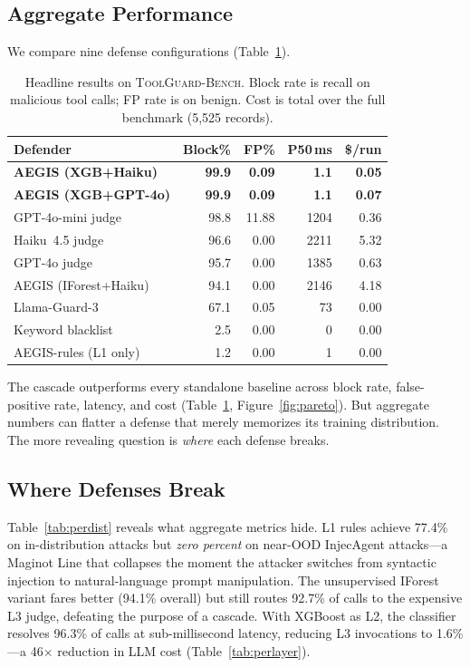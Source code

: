 \documentclass[sigplan,review,anonymous]{acmart}
\newcommand{\bench}{\textsc{ToolGuard-Bench}\xspace}
\begin{document}
\subsection{Aggregate Performance}

We compare nine defense configurations (Table~\ref{tab:overall}).

\begin{table}[t]
\centering\small
\caption{Headline results on \bench. Block rate is recall on malicious tool calls; FP rate is on benign. Cost is total over the full benchmark (5{,}525 records).}
\vspace{-0.1in}
\label{tab:overall}
\begin{tabular}{lrrrr}
\toprule
Defender & Block\% & FP\% & P50\,ms & \$/run \\
\midrule
\rowcolor{green!8}
\textbf{AEGIS (XGB+Haiku)} & \textbf{99.9} & \textbf{0.09} & \textbf{1.1} & \textbf{0.05} \\
\rowcolor{green!8}
\textbf{AEGIS (XGB+GPT-4o)} & \textbf{99.9} & \textbf{0.09} & \textbf{1.1} & \textbf{0.07} \\
GPT-4o-mini judge & 98.8 & 11.88 & 1204 & 0.36 \\
Haiku~4.5 judge & 96.6 & 0.00 & 2211 & 5.32 \\
GPT-4o judge & 95.7 & 0.00 & 1385 & 0.63 \\
AEGIS (IForest+Haiku) & 94.1 & 0.00 & 2146 & 4.18 \\
Llama-Guard-3 & 67.1 & 0.05 & 73 & 0.00 \\
Keyword blacklist & 2.5 & 0.00 & 0 & 0.00 \\
AEGIS-rules (L1 only) & 1.2 & 0.00 & 1 & 0.00 \\
\bottomrule
\end{tabular}
\vspace{-0.1in}
\end{table}

The cascade outperforms every standalone baseline across block rate, false-positive rate, latency, and cost (Table~\ref{tab:overall}, Figure~\ref{fig:pareto}).
But aggregate numbers can flatter a defense that merely memorizes its training distribution.
The more revealing question is \emph{where} each defense breaks.

\subsection{Where Defenses Break}

Table~\ref{tab:perdist} reveals what aggregate metrics hide.
L1 rules achieve 77.4\% on in-distribution attacks but \emph{zero percent} on near-OOD InjecAgent attacks---a Maginot Line that collapses the moment the attacker switches from syntactic injection to natural-language prompt manipulation.
The unsupervised IForest variant fares better (94.1\% overall) but still routes 92.7\% of calls to the expensive L3 judge, defeating the purpose of a cascade.
With XGBoost as L2, the classifier resolves 96.3\% of calls at sub-millisecond latency, reducing L3 invocations to 1.6\%---a 46$\times$ reduction in LLM cost (Table~\ref{tab:perlayer}).
\end{document}
